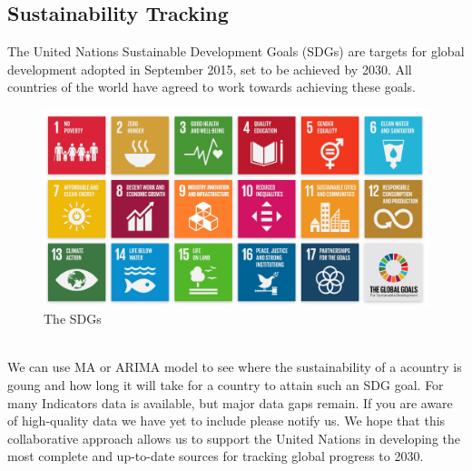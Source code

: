 \documentclass[conference]{IEEEtran}
\begin{document}
\subsection{Sustainability Tracking}
The United Nations Sustainable Development Goals (SDGs) are targets for global development adopted in September 2015, set to be achieved by 2030. All countries of the world have agreed to work towards achieving these goals.\\
\begin{figure}[htbp]
    \centerline{\includegraphics[scale=0.35]{sdg.jpg}}
    \caption{The SDGs}
\end{figure}
\\We can use MA or ARIMA model to see where the sustainability of a acountry is goung and how long it will take for a country to attain such an SDG goal. For many Indicators data is available, but major data gaps remain. If you are aware of high-quality data we have yet to include please notify us. We hope that this collaborative approach allows us to support the United Nations in developing the most complete and up-to-date sources for tracking global progress to 2030.
\bigskip
\end{document}
